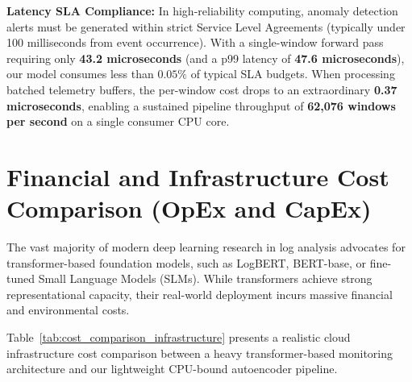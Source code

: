 \textbf{Latency SLA Compliance:} In high-reliability computing, anomaly detection alerts must be generated within strict Service Level Agreements (typically under 100 milliseconds from event occurrence). With a single-window forward pass requiring only \textbf{43.2 microseconds} (and a p99 latency of \textbf{47.6 microseconds}), our model consumes less than $0.05\%$ of typical SLA budgets. When processing batched telemetry buffers, the per-window cost drops to an extraordinary \textbf{0.37 microseconds}, enabling a sustained pipeline throughput of \textbf{62,076 windows per second} on a single consumer CPU core.

\section{Financial and Infrastructure Cost Comparison (OpEx and CapEx)}
\label{sec:cost_financial_infrastructure}
The vast majority of modern deep learning research in log analysis advocates for transformer-based foundation models, such as LogBERT, BERT-base, or fine-tuned Small Language Models (SLMs). While transformers achieve strong representational capacity, their real-world deployment incurs massive financial and environmental costs.

Table~\ref{tab:cost_comparison_infrastructure} presents a realistic cloud infrastructure cost comparison between a heavy transformer-based monitoring architecture and our lightweight CPU-bound autoencoder pipeline.

\begin{table}[htbp]
\centering
\caption{Cloud Infrastructure Cost Comparison: Transformer vs Lightweight Autoencoder}
\label{tab:cost_comparison_infrastructure}
\end{table}

